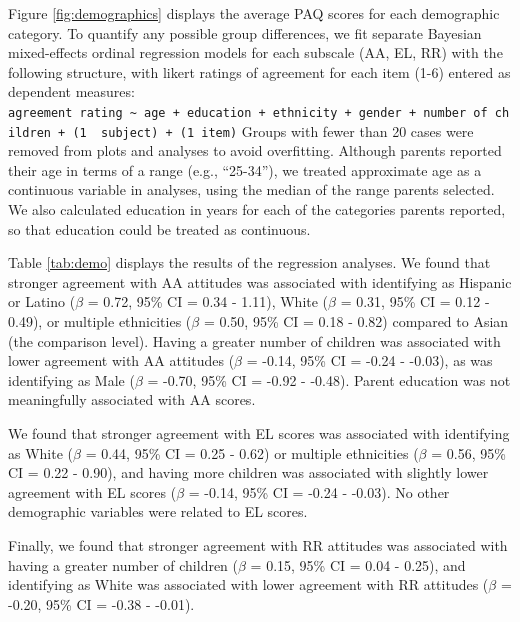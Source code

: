 \documentclass[floatsintext,man]{apa6}
\theoremstyle{definition}
\theoremstyle{definition}
\theoremstyle{definition}
\theoremstyle{remark}
\begin{document}
Figure \ref{fig:demographics} displays the average PAQ scores for each
demographic category. To quantify any possible group differences, we fit
separate Bayesian mixed-effects ordinal regression models for each
subscale (AA, EL, RR) with the following structure, with likert ratings
of agreement for each item (1-6) entered as dependent measures:
\texttt{agreement\ rating\ \textasciitilde{}\ age\ +\ education\ +\ ethnicity\ +\ gender\ +\ number\ of\ children\ +\ (1\ \textbar{}\ subject)\ +\ (1\textbar{}\ item)}
Groups with fewer than 20 cases were removed from plots and analyses to
avoid overfitting. Although parents reported their age in terms of a
range (e.g., \enquote{25-34}), we treated approximate age as a
continuous variable in analyses, using the median of the range parents
selected. We also calculated education in years for each of the
categories parents reported, so that education could be treated as
continuous.

Table \ref{tab:demo} displays the results of the regression analyses. We
found that stronger agreement with AA attitudes was associated with
identifying as Hispanic or Latino (\(\beta\) = 0.72, 95\% CI = 0.34 -
1.11), White (\(\beta\) = 0.31, 95\% CI = 0.12 - 0.49), or multiple
ethnicities (\(\beta\) = 0.50, 95\% CI = 0.18 - 0.82) compared to Asian
(the comparison level). Having a greater number of children was
associated with lower agreement with AA attitudes (\(\beta\) = -0.14,
95\% CI = -0.24 - -0.03), as was identifying as Male (\(\beta\) = -0.70,
95\% CI = -0.92 - -0.48). Parent education was not meaningfully
associated with AA scores.

We found that stronger agreement with EL scores was associated with
identifying as White (\(\beta\) = 0.44, 95\% CI = 0.25 - 0.62) or
multiple ethnicities (\(\beta\) = 0.56, 95\% CI = 0.22 - 0.90), and
having more children was associated with slightly lower agreement with
EL scores (\(\beta\) = -0.14, 95\% CI = -0.24 - -0.03). No other
demographic variables were related to EL scores.

Finally, we found that stronger agreement with RR attitudes was
associated with having a greater number of children (\(\beta\) = 0.15,
95\% CI = 0.04 - 0.25), and identifying as White was associated with
lower agreement with RR attitudes (\(\beta\) = -0.20, 95\% CI = -0.38 -
-0.01).
\end{document}
